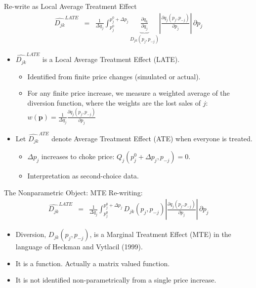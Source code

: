 \documentclass[xcolor=pdftex,dvipsnames,table,mathserif]{beamer}
\begin{document}
\begin{frame}{Re-write as Local Average Treatment Effect}
\begin{eqnarray*}
\widehat{D_{jk} }^{LATE}&=& \frac{1}{\Delta q_j} \int_{p_j^{0}}^{p_j^{0}+\Delta p_j} \underbrace{\frac{\partial q_k}{\partial q_j}}_{D_{jk}(p_j,p_{-j})} \left| \frac{\partial q_j (p_j,p_{-j})}{\partial p_j} \right|\, \partial p_j
\end{eqnarray*}
\begin{itemize}
\item $\widehat{D_{jk}}^{LATE}$ is a Local Average Treatment Effect \alert{(LATE)}.
\begin{itemize}
\item Identified from finite price changes (simulated or actual).
\item For any finite price increase, we measure a weighted average of the diversion function, where the weights are the lost sales of $j$:  $w(\mathbf{p}) = \frac{1}{\Delta q_j} \frac{\partial q_j(p_j,p_{-j})}{\partial p_j} $
\end{itemize}
\pause
\item Let $\widehat{D_{jk}}^{ATE}$ denote Average Treatment Effect \alert{(ATE)} when everyone is treated.
 \begin{itemize}
\item $\Delta p_j$ increases to \alert{choke price}:  $Q_j(p_j^0 + \Delta p_j, p_{-j}) = 0$.
\item Interpretation as second-choice data.
\end{itemize}
\end{itemize}
\end{frame}



\begin{frame}{The Nonparametric Object: MTE}
Re-writing:
\begin{eqnarray*}
\widehat{D_{jk}}^{LATE}&=& \frac{1}{\Delta q_j} \int_{p_j^{0}}^{p_j^{0}+\Delta p_j} D_{jk}(p_j,p_{-j}) \left| \frac{\partial q_j (p_j,p_{-j})}{\partial p_j} \right|\, \partial p_j
\end{eqnarray*}
\begin{itemize}
\item Diversion, $D_{jk}(p_j,p_{-j})$, is a Marginal Treatment Effect \alert{(MTE)}  in the language of Heckman and Vytlacil (1999).
\item It is a \alert{function}. Actually a \alert{matrix valued function}.
\item It is not identified non-parametrically from a single price increase.
\end{itemize}
\end{frame}
\end{document}
